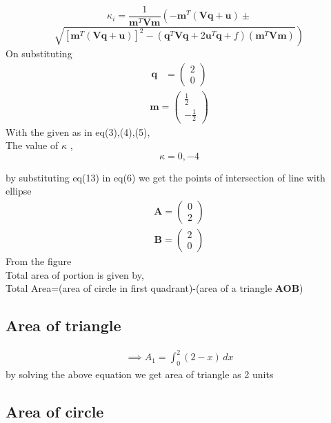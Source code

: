 \documentclass[journal,12pt,twocolumn]{IEEEtran}
\let\vec\mathbf
\newcommand{\myvec}[1]{\ensuremath{\begin{pmatrix}#1\end{pmatrix}}}
\providecommand{\brak}[1]{\ensuremath{\left(#1\right)}}
\providecommand{\lbrak}[1]{\ensuremath{\left(#1\right.}}
\providecommand{\rbrak}[1]{\ensuremath{\left.#1\right)}}
\providecommand{\sbrak}[1]{\ensuremath{{}\left[#1\right]}}
\begin{document}
\begin{equation*}
\kappa_i = \frac{1}
{
\vec{m}^T\vec{V}\vec{m}
}
\lbrak{-\vec{m}^T\brak{\vec{V}\vec{q}+\vec{u}}}
\pm
\end{equation*}
\begin{equation}
\rbrak{\sqrt{
\sbrak{
\vec{m}^T\brak{\vec{V}\vec{q}+\vec{u}}
}^2
-
\brak
{
\vec{q}^T\vec{V}\vec{q} + 2\vec{u}^T\vec{q} +f
}
\brak{\vec{m}^T\vec{V}\vec{m}}
}
}
\end{equation}
On substituting\\
\begin{align}
\vec{q} &= \myvec{
2\\
0
} 
\end{align}
\begin{align}
\vec{m} = \myvec{\frac{1}{2} \\ -\frac{1}{2}}
\end{align}
With the given as in eq(3),(4),(5),\\ 

The value of $\kappa$ ,\\
\begin{equation}
\kappa =0,-4
\end{equation}
    
by substituting eq(13) in eq(6) we get the
points of intersection of line with ellipse \\
\begin{align}
    \vec{A}=\myvec{
0\\
2
    }
\end{align}
\begin{align}
    \vec{B}=\myvec{
2\\
0
    }
\end{align}
From the figure \\
Total area of portion is given by,\\ 
Total Area=(area of circle in first quadrant)-(area of a triangle \textbf{AOB})

\subsection*{Area of triangle}

\begin{align}
\implies A_1=\int_{0}^{2} (2-x) \,dx
\end{align}
by solving the above equation we get area of triangle as 2 units
\subsection*{Area of circle}
\end{document}
